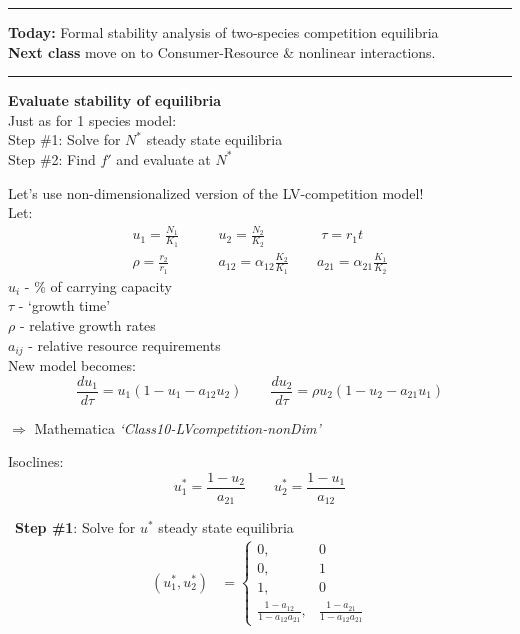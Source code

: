 \documentclass{article}
\newcommand{\note}[1]{\colorbox{gray!30}{#1}}
\newcommand{\ind}{\-\hspace{1cm}}
\begin{document}
\noindent{}
\rule[0.5ex]{\linewidth}{1pt}
\textbf{Today:} 
\ind Formal stability analysis of two-species competition equilibria\\
\textbf{Next class} move on to Consumer-Resource \& nonlinear interactions.

\rule[0.5ex]{\linewidth}{1pt}

\textbf{Evaluate stability of equilibria} \\
Just as for 1 species model:\\
\ind Step \#1: Solve for $N^*$ steady state equilibria\\
\ind Step \#2: Find $f'$ and evaluate at $N^*$

Let's use non-dimensionalized version of the LV-competition model!\\
Let:
\begin{align*}
	u_1 = \frac{N_1}{K_1} \quad & \quad u_2 = \frac{N_2}{K_2} \quad  \quad \quad \quad \tau = r_1 t\\
	\rho = \frac{r_2}{r_1} \quad & \quad a_{12}=\alpha_{12}\frac{K_2}{K_1} \quad \quad a_{21}=\alpha_{21}\frac{K_1}{K_2} 
\end{align*}
\ind $u_i$ - \% of carrying capacity\\
\ind $\tau$ - `growth time'\\
\ind $\rho$ - relative growth rates\\
\ind $a_{ij}$ - relative resource requirements\\


New model becomes:
\begin{equation*}
	\frac{d u_1}{d\tau}=u_1(1-u_1 - a_{12}u_2) \quad \quad \frac{d u_2}{d\tau}=\rho u_2(1-u_2 - a_{21}u_1)
\end{equation*}

\note{$\Rightarrow$ Mathematica \emph{`Class10-LVcompetition-nonDim'}}
\vspace{0.5cm}

Isoclines:
\begin{equation*}
	u_1^*=\frac{1-u_2}{a_{21}} \quad \quad u_2^*=\frac{1-u_1}{a_{12}}
\end{equation*}

\
\textbf{Step \#1}: Solve for $u^*$ steady state equilibria
\begin{align*}
(u_1^*,u_2^*)& =
\begin{cases}
	 0 , & 0  \\
	0, & 1  \\
	1, & 0\\
	\frac{1-a_{12}}{1- a_{12} a_{21} }, & \frac{1-a_{21}}{1- a_{12} a_{21} }
\end{cases}
\end{align*}
\end{document}
